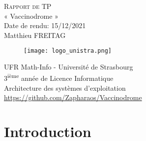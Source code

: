 \documentclass[a4paper]{article}
\makeatletter
\newenvironment{expl}{%
  \begin{list}{}{%
      \small\itshape%
      \topsep\z@%
      \listparindent0pt%
      \parsep0.75\baselineskip%
      \setlength{\leftmargin}{20mm}%
      \setlength{\rightmargin}{20mm}%
    }
  \item[]}%
  {\end{list}}
\makeatother
\begin{document}
\begin{titlepage}
    \begin{center}
        \vspace*{4.5cm}
        {\Huge\scshape Rapport de TP}\\[1.5cm]
        {\large « Vaccinodrome »}\\[0.5cm]
        {\large Date de rendu: 15/12/2021}\\[0.5cm]
        {\large Matthieu FREITAG}\\[1cm]
        \begin{figure}[H]
            \centering
            \texttt{[image: logo\_unistra.png]}\\[1cm]
        \end{figure}
        {\large UFR Math-Info - Université de Strasbourg}\\[0.5cm]
        {\large 3\textsuperscript{ième} année de Licence Informatique}\\[0.5cm]
        {\large Architecture des systèmes d'exploitation }\\[4cm]
        {\large \href{https://github.com/Zapharaos/Vaccinodrome}{https://github.com/Zapharaos/Vaccinodrome}}
        \vfill
    \end{center}
\end{titlepage}
\clearpage


\tableofcontents
\clearpage 


\section{Introduction}
\end{document}
